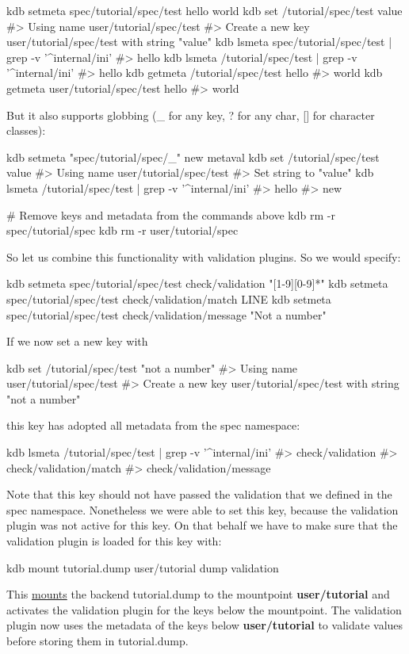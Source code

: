 \begin{DoxyCode}
kdb setmeta spec/tutorial/spec/test hello world
kdb set /tutorial/spec/test value
#> Using name user/tutorial/spec/test
#> Create a new key user/tutorial/spec/test with string "value"
kdb lsmeta spec/tutorial/spec/test | grep -v '^internal/ini'
#> hello
kdb lsmeta /tutorial/spec/test | grep -v '^internal/ini'
#> hello
kdb getmeta /tutorial/spec/test hello
#> world
kdb getmeta user/tutorial/spec/test hello
#> world
\end{DoxyCode}


But it also supports globbing ({\ttfamily \+\_\+} for any key, {\ttfamily ?} for any char, {\ttfamily \mbox{[}\mbox{]}} for character classes)\+:


\begin{DoxyCode}
kdb setmeta "spec/tutorial/spec/\_" new metaval
kdb set /tutorial/spec/test value
#> Using name user/tutorial/spec/test
#> Set string to "value"
kdb lsmeta /tutorial/spec/test | grep -v '^internal/ini'
#> hello
#> new

# Remove keys and metadata from the commands above
kdb rm -r spec/tutorial/spec
kdb rm -r user/tutorial/spec
\end{DoxyCode}


So let us combine this functionality with validation plugins. So we would specify\+:


\begin{DoxyCode}
kdb setmeta spec/tutorial/spec/test check/validation "[1-9][0-9]*"
kdb setmeta spec/tutorial/spec/test check/validation/match LINE
kdb setmeta spec/tutorial/spec/test check/validation/message "Not a number"
\end{DoxyCode}


If we now set a new key with 
\begin{DoxyCode}
kdb set /tutorial/spec/test "not a number"
#> Using name user/tutorial/spec/test
#> Create a new key user/tutorial/spec/test with string "not a number"
\end{DoxyCode}
 this key has adopted all metadata from the spec namespace\+: 
\begin{DoxyCode}
kdb lsmeta /tutorial/spec/test | grep -v '^internal/ini'
#> check/validation
#> check/validation/match
#> check/validation/message
\end{DoxyCode}
 Note that this key should not have passed the validation that we defined in the spec namespace. Nonetheless we were able to set this key, because the validation plugin was not active for this key. On that behalf we have to make sure that the validation plugin is loaded for this key with\+: 
\begin{DoxyCode}
kdb mount tutorial.dump user/tutorial dump validation
\end{DoxyCode}
 This \hyperlink{doc_tutorials_mount_md}{mounts} the backend {\ttfamily tutorial.\+dump} to the mountpoint {\bfseries user/tutorial} and activates the validation plugin for the keys below the mountpoint. The validation plugin now uses the metadata of the keys below {\bfseries user/tutorial} to validate values before storing them in {\ttfamily tutorial.\+dump}.

